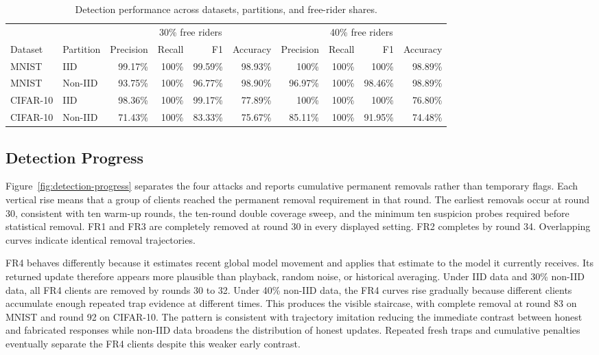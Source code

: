 \documentclass[conference]{IEEEtran}
\begin{document}
\begin{table}[t]
\centering
\caption{Detection performance across datasets, partitions, and free-rider shares.}
\label{tab:aggregate}
\setlength{\tabcolsep}{3.5pt}
\begin{tabular}{llrrrrrrrr}
\toprule
& & \multicolumn{4}{c}{30\% free riders} & \multicolumn{4}{c}{40\% free riders} \\
\cmidrule(lr){3-6}\cmidrule(lr){7-10}
Dataset & Partition & Precision & Recall & F1 & Accuracy & Precision & Recall & F1 & Accuracy \\
\midrule
MNIST & IID     & 99.17\% & 100\% & 99.59\% & 98.93\% & 100\%   & 100\% & 100\%   & 98.89\% \\
MNIST & Non-IID & 93.75\% & 100\% & 96.77\% & 98.90\% & 96.97\% & 100\% & 98.46\% & 98.89\% \\
CIFAR-10 & IID     & 98.36\% & 100\% & 99.17\% & 77.89\% & 100\%   & 100\% & 100\%   & 76.80\% \\
CIFAR-10 & Non-IID & 71.43\% & 100\% & 83.33\% & 75.67\% & 85.11\% & 100\% & 91.95\% & 74.48\% \\
\bottomrule
\end{tabular}
\end{table}

\subsection{Detection Progress}
Figure~\ref{fig:detection-progress} separates the four attacks and reports cumulative permanent removals rather than temporary flags. Each vertical rise means that a group of clients reached the permanent removal requirement in that round. The earliest removals occur at round 30, consistent with ten warm-up rounds, the ten-round double coverage sweep, and the minimum ten suspicion probes required before statistical removal. FR1 and FR3 are completely removed at round 30 in every displayed setting. FR2 completes by round 34. Overlapping curves indicate identical removal trajectories.

FR4 behaves differently because it estimates recent global model movement and applies that estimate to the model it currently receives. Its returned update therefore appears more plausible than playback, random noise, or historical averaging. Under IID data and 30\% non-IID data, all FR4 clients are removed by rounds 30 to 32. Under 40\% non-IID data, the FR4 curves rise gradually because different clients accumulate enough repeated trap evidence at different times. This produces the visible staircase, with complete removal at round 83 on MNIST and round 92 on CIFAR-10. The pattern is consistent with trajectory imitation reducing the immediate contrast between honest and fabricated responses while non-IID data broadens the distribution of honest updates. Repeated fresh traps and cumulative penalties eventually separate the FR4 clients despite this weaker early contrast.
\end{document}
